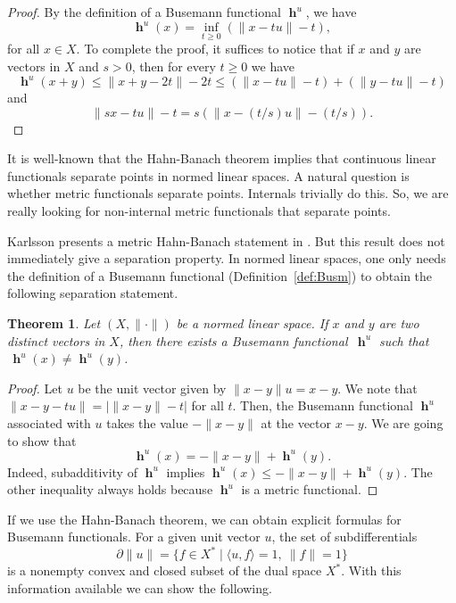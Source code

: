 \documentclass[a4paper,12pt]{article}
\newtheorem{thm}{Theorem}[section]
\theoremstyle{definition}
\DeclareMathOperator{\h}{\mathbf{h}}
\newcommand{\abs}[1]{\lvert#1\rvert}
\newcommand{\norm}[1]{\lVert#1\rVert}
\newcommand{\dpair}[2]{\langle#1, #2\rangle}
\numberwithin{equation}{section}
\begin{document}
\begin{proof}
By the definition of a Busemann functional $\h^u$, we have 
$$
	\h^u(x)=\inf_{t\geq 0}(\norm{x-tu}-t),
$$ 
for all $x\in X$. To complete the proof, it suffices to notice that if $x$ and 
$y$ are vectors in $X$ and $s > 0$, then for every $t\geq 0$ we have
$$ \h^u(x+y) \leq \norm{x+y - 2t} - 2t
\leq (\norm{x-tu}-t) + (\norm{y-tu}-t)$$
and
$$ \norm{sx - tu} - t = s (\norm{x-(t/s)u}-(t/s)).$$
\end{proof}

It is well-known that the Hahn-Banach theorem implies that continuous linear 
functionals separate points in normed linear spaces. A natural question is 
whether metric functionals separate points. Internals trivially do this. So, we
are really looking for non-internal metric functionals that separate points.

Karlsson presents a metric Hahn-Banach statement in 
\cite[Proposition~1]{Karlsson2021}. But this result does not immediately give
a separation property. In normed linear spaces, one only needs the definition of 
a Busemann functional (Definition~\ref{def:Busm}) to obtain the following 
separation statement.

\begin{thm}
Let $(X,\norm{\cdot})$ be a normed linear space.
If $x$ and $y$ are two distinct vectors in $X$, then there exists a Busemann 
functional $\,\h^u$ such that $\,\h^u(x)\neq \h^u(y)$.
\end{thm}

\begin{proof}
Let $u$ be the unit vector given by $\norm{x-y}u = x-y$. We note that 
$\norm{x-y-tu} = \abs{\norm{x-y}-t}$ for all $t$. Then, the Busemann functional 
$\h^u$ associated with $u$ takes the value $-\norm{x-y}$ at the vector $x-y$. 
We are going to show that
$$
	\h^u(x) = -\norm{x-y} + \h^u(y).
$$
Indeed, subadditivity of $\h^u$ implies $\h^u(x) \leq -\norm{x-y} + \h^u(y)$. 
The other inequality always holds because $\h^u$ is a metric functional.
\end{proof}

If we use the Hahn-Banach theorem, we can obtain explicit formulas for Busemann 
functionals. For a given unit vector $u$, the set of subdifferentials 
\begin{displaymath}
	\partial \norm{u} = \{ f \in X^* 
	\mid \dpair{u}{f} 
	= 1,\ \norm{f} = 1 \}
\end{displaymath}
is a nonempty convex and closed subset of the dual space $X^*$. With this 
information available we can show the following.
\end{document}
